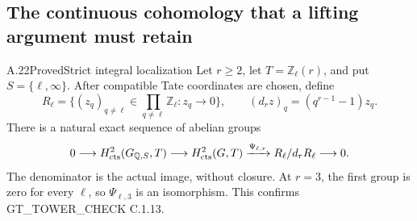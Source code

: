 \subsection{The continuous cohomology that a lifting argument must retain}

\begin{result}{A.22}{Proved}{Strict integral localization}
\label{coh:strict}
Let $r\geq2$, let $T=\mathbb Z_\ell(r)$, and put
$S=\{\ell,\infty\}$. After compatible Tate coordinates are chosen,
define
\[
 R_\ell=\{(z_q)_{q\ne\ell}\in\prod_{q\ne\ell}\mathbb Z_\ell:
                         z_q\longrightarrow0\},
 \qquad (d_rz)_q=(q^{r-1}-1)z_q.
\]
There is a natural exact sequence of abelian groups
\[
 0\longrightarrow H^2_{\rm cts}(G_{\mathbb Q,S},T)
 \longrightarrow H^2_{\rm cts}(G,T)
 \xrightarrow{\Psi_{\ell,r}}R_\ell/d_rR_\ell
 \longrightarrow0.
\]
The denominator is the actual image, without closure. At $r=3$, the
first group is zero for every $\ell$, so $\Psi_{\ell,3}$ is an
isomorphism. This confirms GT\_TOWER\_CHECK C.1.13.
\end{result}
